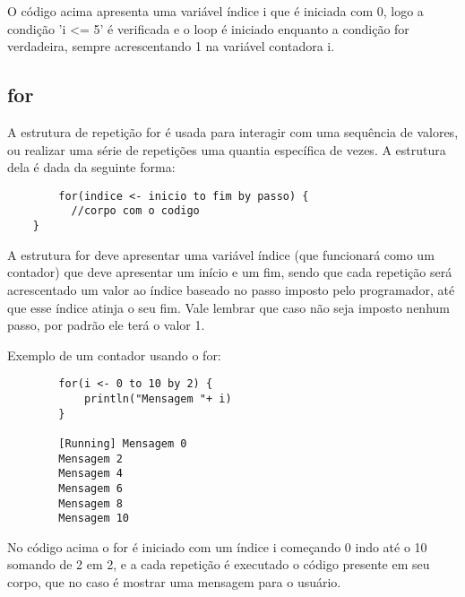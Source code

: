 	O c\'{o}digo acima apresenta uma vari\'{a}vel \'{i}ndice i que \'{e} iniciada com 0, logo a condi\c{c}\~{a}o 'i <= 5' \'{e} verificada e o loop \'{e} iniciado enquanto a condi\c{c}\~{a}o for verdadeira, sempre acrescentando 1 na vari\'{a}vel contadora i.
	
	\subsection{for}
	
	A estrutura de repeti\c{c}\~{a}o for \'{e} usada para interagir com uma sequ\^{e}ncia de valores, ou realizar uma s\'{e}rie de repetições uma quantia específica de vezes. A estrutura dela \'{e} dada da seguinte forma:
	
	\begin{lstlisting}
		for(indice <- inicio to fim by passo) {
		  //corpo com o codigo
	}
	\end{lstlisting} 

	A estrutura for deve apresentar uma vari\'{a}vel \'{i}ndice (que funcionará como um contador) que deve apresentar um início e um fim, sendo que cada repeti\c{c}\~{a}o ser\'{a} acrescentado um valor ao \'{i}ndice baseado no passo imposto pelo programador, at\'{e} que esse \'{i}ndice atinja o seu fim. Vale lembrar que caso não seja imposto nenhum passo, por padrão ele ter\'{a} o valor 1.
	
	Exemplo de um contador usando o for:
	
	\begin{lstlisting}
		for(i <- 0 to 10 by 2) {
			println("Mensagem "+ i)
		}
	
		[Running] Mensagem 0
		Mensagem 2
		Mensagem 4
		Mensagem 6
		Mensagem 8
		Mensagem 10
	\end{lstlisting}

	No c\'{o}digo acima o for \'{e} iniciado com um \'{i}ndice i começando 0 indo at\'{e} o 10 somando de 2 em 2, e a cada repeti\c{c}\~{a}o \'{e} executado o c\'{o}digo presente em seu corpo, que no caso \'{e} mostrar uma mensagem para o usu\'{a}rio.